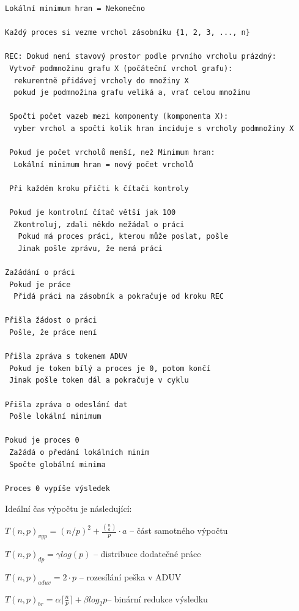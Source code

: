 \documentclass[a4paper,10pt]{report}
\begin{document}
\begin{verbatim}
Lokální minimum hran = Nekonečno

Každý proces si vezme vrchol zásobníku {1, 2, 3, ..., n}

REC: Dokud není stavový prostor podle prvního vrcholu prázdný:
 Vytvoř podmnožinu grafu X (počáteční vrchol grafu):
  rekurentně přidávej vrcholy do množiny X
  pokud je podmnožina grafu veliká a, vrať celou množinu

 Spočti počet vazeb mezi komponenty (komponenta X):
  vyber vrchol a spočti kolik hran inciduje s vrcholy podmnožiny X
 
 Pokud je počet vrcholů menší, než Minimum hran:
  Lokální minimum hran = nový počet vrcholů

 Při každém kroku přičti k čítači kontroly

 Pokud je kontrolní čítač větší jak 100
  Zkontroluj, zdali někdo nežádal o práci
   Pokud má proces práci, kterou může poslat, pošle
   Jinak pošle zprávu, že nemá práci

Zažádání o práci
 Pokud je práce
  Přidá práci na zásobník a pokračuje od kroku REC

Přišla žádost o práci
 Pošle, že práce není

Přišla zpráva s tokenem ADUV
 Pokud je token bílý a proces je 0, potom končí
 Jinak pošle token dál a pokračuje v cyklu

Přišla zpráva o odeslání dat
 Pošle lokální minimum

Pokud je proces 0
 Zažádá o předání lokálních minim
 Spočte globální minima

Proces 0 vypíše výsledek
\end{verbatim}

Ideální čas výpočtu je následující:

\hspace{1cm}

$T(n,p)_{vyp} = (n/p)^2 + \frac{{n \choose a}}{p}\cdot a$ -- část samotného výpočtu

\hspace{1cm}

$T(n,p)_{dp} = \gamma log(p)$ -- distribuce dodatečné práce

\hspace{1cm}

$T(n,p)_{aduv} = 2 \cdot p$ -- rozesílání peška v ADUV

\hspace{1cm}

$T(n,p)_{br} = \alpha \lceil \frac{n}{p} \rceil + \beta log_{2}p$-- binární redukce výsledku
\end{document}
